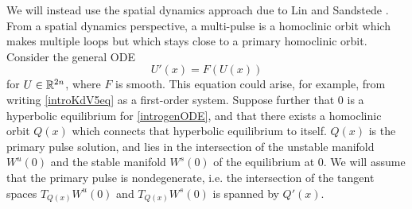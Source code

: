\documentclass[thesis.tex]{subfiles}
\begin{document}
We will instead use the spatial dynamics approach due to Lin \cite{Lin1990} and Sandstede \cite{Sandstede1993,SandstedeStrut}. From a spatial dynamics perspective, a multi-pulse is a homoclinic orbit which makes multiple loops but which stays close to a primary homoclinic orbit. Consider the general ODE
\begin{equation}\label{introgenODE}
U'(x) = F(U(x))
\end{equation}
for $U \in \mathbb{R}^{2n}$, where $F$ is smooth. This equation could arise, for example, from writing 
\cref{introKdV5eq} as a first-order system. Suppose further that 0 is a hyperbolic equilibrium for \cref{introgenODE}, and that there exists a homoclinic orbit $Q(x)$ which connects that hyperbolic equilibrium to itself. $Q(x)$ is the primary pulse solution, and lies in the intersection of the unstable manifold $W^u(0)$ and the stable manifold $W^s(0)$ of the equilibrium at 0. We will assume that the primary pulse is nondegenerate, i.e. the intersection of the tangent spaces $T_{Q(x)}W^u(0)$ and $T_{Q(x)}W^s(0)$ is spanned by $Q'(x)$.
\end{document}
